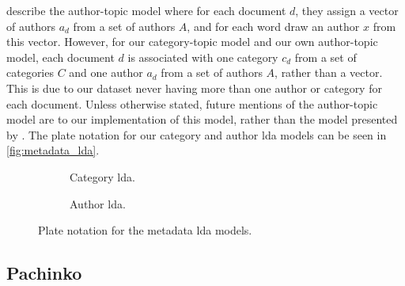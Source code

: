 \citet{author_topic_2012} describe the author-topic model where for each document $d$, they assign a vector of authors $a_d$ from a set of authors $A$, and for each word draw an author $x$ from this vector.
However, for our category-topic model and our own author-topic model, each document $d$ is associated with one category $c_d$ from a set of categories $C$ and one author $a_d$ from a set of authors $A$, rather than a vector.
This is due to our dataset never having more than one author or category for each document.
Unless otherwise stated, future mentions of the author-topic model are to our implementation of this model, rather than the model presented by \citet{author_topic_2012}.
The plate notation for our category and author \gls{lda} models can be seen in \autoref{fig:metadata_lda}.

\begin{figure*}[ht]
	\centering
	\begin{subfigure}{0.3\textwidth}
		\centering
		
		\caption{Category \gls{lda}.}
		\label{fig:category_lda}
	\end{subfigure}
	\hspace{5em}
	\begin{subfigure}{0.3\textwidth}
		\centering
		
		\caption{Author \gls{lda}.}
		\label{fig:author_lda}
	\end{subfigure}
	\caption{Plate notation for the metadata \gls{lda} models.}
	\label{fig:metadata_lda}
\end{figure*}

\subsection{Pachinko}

